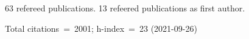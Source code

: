 63 refereed publications. 13 refeered publications as first author.

Total citations~=~2001; h-index~=~23 (2021-09-26)